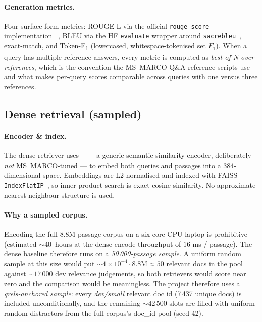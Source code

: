 \documentclass[11pt,a4paper]{article}
\newcommand{\devsmall}{\textit{dev/small}}
\newcommand{\msmarco}{MS~MARCO}
\newcommand{\F}{F\textsubscript{1}}
\newcommand{\Tokenf}{Token-\F}
\newcommand{\rougel}{ROUGE-L}
\begin{document}
\paragraph{Generation metrics.}  Four surface-form metrics: \rougel{}
via the official \texttt{rouge\_score} implementation
~\cite{lin2004rouge}, BLEU via the HF \texttt{evaluate} wrapper
around \texttt{sacrebleu}~\cite{papineni2002bleu}, exact-match, and
\Tokenf{} (lowercased, whitespace-tokenised set $F_1$).  When a
query has multiple reference answers, every metric is computed as
\emph{best-of-N over references}, which is the convention the
\msmarco{} Q\&A reference scripts use and what makes per-query
scores comparable across queries with one versus three references.

\subsection{Dense retrieval (sampled)}
\label{sec:w4}

\paragraph{Encoder \& index.}  The dense retriever uses
\texttt{}~\cite{reimers2019sbert,wang2020minilm}
--- a generic semantic-similarity encoder, deliberately
\emph{not} \msmarco{}-tuned --- to embed both queries and passages
into a 384-dimensional space.  Embeddings are L2-normalised and
indexed with FAISS \texttt{IndexFlatIP}~\cite{johnson2019faiss}, so
inner-product search is exact cosine similarity.  No approximate
nearest-neighbour structure is used.

\paragraph{Why a sampled corpus.}
\label{sec:w4-sampling-caveat}
Encoding the full 8.8M passage corpus on a six-core CPU laptop is
prohibitive (estimated $\sim\!40$~hours at the dense encode throughput
of $16$ ms / passage).  The dense baseline therefore runs on a
\emph{50\,000-passage sample}.  A uniform random sample at this size
would put $\sim\!4\!\times\!10^{-4}\!\cdot\!8.8\textrm{M}\!\approx\!50$
relevant docs in the pool against $\sim\!17\,000$ dev relevance
judgements, so both retrievers would score near zero and the
comparison would be meaningless.  The project therefore uses a
\emph{qrels-anchored sample}: every \devsmall{} relevant doc id
(7\,437 unique docs) is included unconditionally, and the remaining
$\sim\!42\,500$ slots are filled with uniform random distractors
from the full corpus's doc\_id pool (seed 42).
\end{document}
